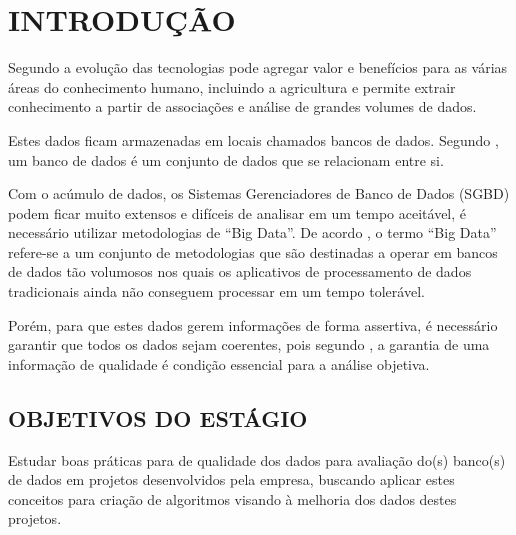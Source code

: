 \chapter{INTRODUÇÃO}
\label{INTRODUCAO}
\vspace*{-2cm}

Segundo  a evolução das tecnologias pode agregar valor e benefícios para as várias áreas do conhecimento humano, incluindo a agricultura e permite extrair conhecimento a partir de associações e análise de grandes volumes de dados.

Estes dados ficam armazenadas em locais chamados bancos de dados. Segundo , um banco de dados é um conjunto de dados que se relacionam entre si.

Com o acúmulo de dados, os Sistemas Gerenciadores de Banco de Dados (SGBD) podem ficar muito extensos e difíceis de analisar em um tempo aceitável, é necessário utilizar metodologias de “Big Data”. De acordo , o termo “Big Data” refere-se a um conjunto de metodologias que são destinadas a operar em bancos de dados tão volumosos nos quais os aplicativos de processamento de dados tradicionais ainda não conseguem processar em um tempo tolerável.

Porém, para que estes dados gerem informações de forma assertiva, é necessário garantir que todos os dados sejam coerentes, pois segundo , a garantia de uma informação de qualidade é condição essencial para a análise objetiva.

\section{OBJETIVOS DO ESTÁGIO}

Estudar boas práticas para de qualidade dos dados para avaliação do(s) banco(s) de dados em projetos desenvolvidos pela empresa, buscando aplicar estes conceitos para criação de algoritmos visando à melhoria dos dados destes projetos.
